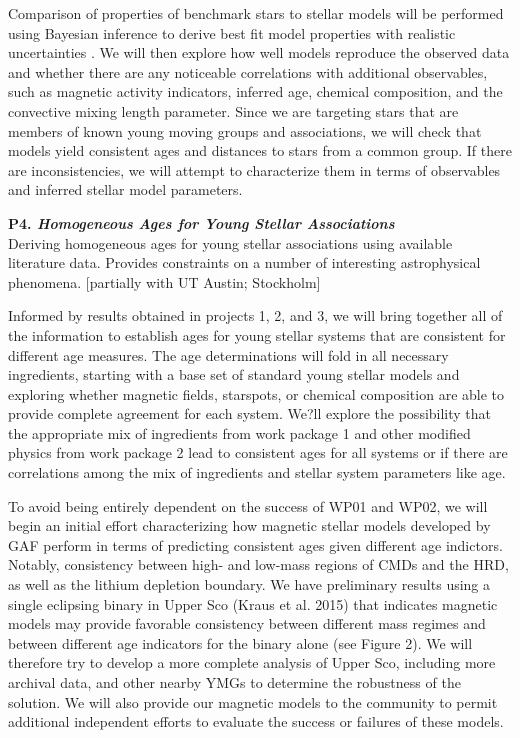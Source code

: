 \documentclass[12pt,a4paper]{article}
\begin{document}
Comparison of properties of benchmark stars to stellar models will be performed using Bayesian inference to derive best fit model properties with realistic uncertainties \citep{Mann2015b}. We will then explore how well models reproduce the observed data and whether there are any noticeable correlations with additional observables, such as magnetic activity indicators, inferred age, chemical composition, and the convective mixing length parameter. Since we are targeting stars that are members of known young moving groups and associations, we will check that models yield consistent ages and distances to stars from a common group. If there are inconsistencies, we will attempt to characterize them in terms of observables and inferred stellar model parameters.

\textbf{P4. \emph{Homogeneous Ages for Young Stellar Associations}} \\
Deriving homogeneous ages for young stellar associations using available literature data. Provides constraints on a number of interesting astrophysical phenomena. [partially with UT Austin; Stockholm]

Informed by results obtained in projects 1, 2, and 3, we will bring together all of the information to establish ages for young stellar systems that are consistent for different age measures. The age determinations will fold in all necessary ingredients, starting with a base set of standard young stellar models and exploring whether magnetic fields, starspots, or chemical composition are able to provide complete agreement for each system. We?ll explore the possibility that the appropriate mix of ingredients from work package 1 and other modified physics from work package 2 lead to consistent ages for all systems or if there are correlations among the mix of ingredients and stellar system parameters like age.

To avoid being entirely dependent on the success of WP01 and WP02, we will begin an initial effort characterizing how magnetic stellar models developed by GAF perform in terms of predicting consistent ages given different age indictors. Notably, consistency between high- and low-mass regions of CMDs and the HRD, as well as the lithium depletion boundary. We have preliminary results using a single eclipsing binary in Upper Sco (Kraus et al. 2015) that indicates magnetic models may provide favorable consistency between different mass regimes and between different age indicators for the binary alone (see Figure 2). We will therefore try to develop a more complete analysis of Upper Sco, including more archival data, and other nearby YMGs to determine the robustness of the solution. We will also provide our magnetic models to the community to permit additional independent efforts to evaluate the success or failures of these models.
\end{document}
